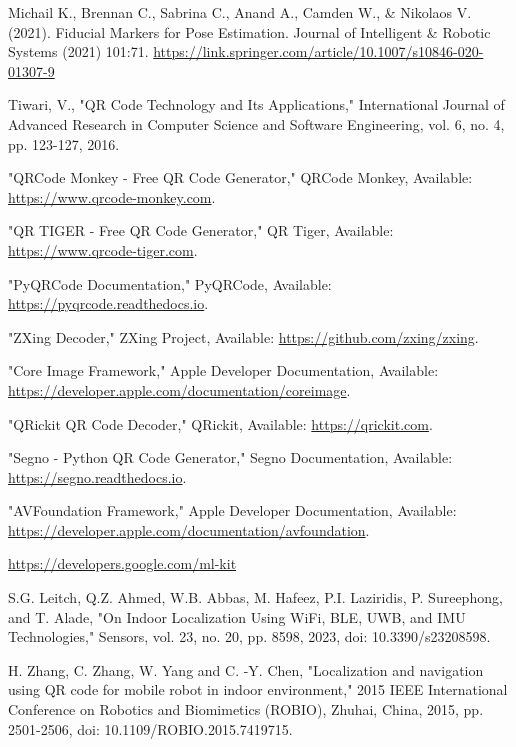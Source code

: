 
\newpage
{}
\renewcommand{\bibname}{References}

\begin{thebibliography}{9}
	Michail K., Brennan C., Sabrina C., Anand A., Camden W., \& Nikolaos
	V. (2021). Fiducial Markers for Pose Estimation. Journal of Intelligent \&
	Robotic Systems (2021) 101:71.
	\url{https://link.springer.com/article/10.1007/s10846-020-01307-9}
		
	 Tiwari, V., "QR Code Technology and Its Applications," International Journal of Advanced Research in Computer Science and Software Engineering, vol. 6, no. 4, pp. 123-127, 2016.
	
	 "QRCode Monkey - Free QR Code Generator," QRCode Monkey, Available:
	\url{https://www.qrcode-monkey.com}.
	
	 "QR TIGER - Free QR Code Generator," QR Tiger, Available: \url{https://www.qrcode-tiger.com}.
	
	 "PyQRCode Documentation," PyQRCode, Available: \url{https://pyqrcode.readthedocs.io}.
	
	 "ZXing Decoder," ZXing Project, Available: \url{https://github.com/zxing/zxing}.
	
	 "Core Image Framework," Apple Developer Documentation, Available: \url{https://developer.apple.com/documentation/coreimage}.
	
	 "QRickit QR Code Decoder," QRickit, Available: \url{https://qrickit.com}.
	
	 "Segno - Python QR Code Generator," Segno Documentation, Available: \url{https://segno.readthedocs.io}.
	
	 "AVFoundation Framework," Apple Developer Documentation, Available: \url{https://developer.apple.com/documentation/avfoundation}.
	
	\url{https://developers.google.com/ml-kit}
	
	 S.G. Leitch, Q.Z. Ahmed, W.B. Abbas, M. Hafeez, P.I. Laziridis, P. Sureephong, and T. Alade, "On Indoor Localization Using WiFi, BLE, UWB, and IMU Technologies," Sensors, vol. 23, no. 20, pp. 8598, 2023, doi: 10.3390/s23208598.
	
	H. Zhang, C. Zhang, W. Yang and C. -Y. Chen, "Localization and navigation using QR code for mobile robot in indoor environment," 2015 IEEE International Conference on Robotics and Biomimetics (ROBIO), Zhuhai, China, 2015, pp. 2501-2506, doi: 10.1109/ROBIO.2015.7419715.


\end{thebibliography}
